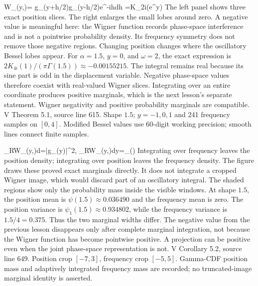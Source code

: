 {W_\alpha(y,\omega)=\int
 g_\alpha(y+h/2)g_\alpha(y-h/2)e^{-i\omega h}dh
 =K_{2i\omega}(e^y)}
{The left panel shows three exact position slices. The right enlarges the
small lobes around zero. A negative value is meaningful here: the Wigner
function records phase-space interference and is not a pointwise probability
density. Its frequency symmetry does not remove those negative regions.
Changing position changes where the oscillatory Bessel lobes appear.}
{For $\alpha=1.5$, $y=0$, and $\omega=2$, the exact expression is
$2K_{4i}(1)/(\pi\Gamma(1.5))\approx-0.00155215$.
The integral remains real because its sine part is odd in the displacement
variable. Negative phase-space values therefore coexist with real-valued
Wigner slices. Integrating over an entire coordinate produces positive
marginals, which is the next lesson's separate statement.}
{Wigner negativity and positive probability marginals are compatible.}
{V Theorem 5.1, source line 615. Shape $1.5$; $y=-1,0,1$ and 241
frequency samples on $[0,4]$. Modified Bessel values use 60-digit working
precision; smooth lines connect finite samples.}

{\int_{\mathbb R}W_\alpha(y,\omega)d\omega=|g_\alpha(y)|^2,
 \qquad
 \int_{\mathbb R}W_\alpha(y,\omega)dy=\rho_\alpha(\omega)}
{Integrating over frequency leaves the position density; integrating over
position leaves the frequency density. The figure draws these proved exact
marginals directly. It does not integrate a cropped Wigner image, which would
discard part of an oscillatory integral. The shaded regions show only the
probability mass inside the visible windows.}
{At shape $1.5$, the position mean is
$\psi(1.5)\approx0.036490$ and the frequency mean is zero. The position
variance is $\psi_1(1.5)\approx0.934802$, while the frequency variance is
$1.5/4=0.375$. Thus the two marginal widths differ. The negative value from
the previous lesson disappears only after complete marginal integration,
not because the Wigner function has become pointwise positive.}
{A projection can be positive even when the joint phase-space representation is not.}
{V Corollary 5.2, source line 649. Position crop $[-7,3]$, frequency crop
$[-5,5]$. Gamma-CDF position mass and adaptively integrated frequency mass
are recorded; no truncated-image marginal identity is asserted.}

